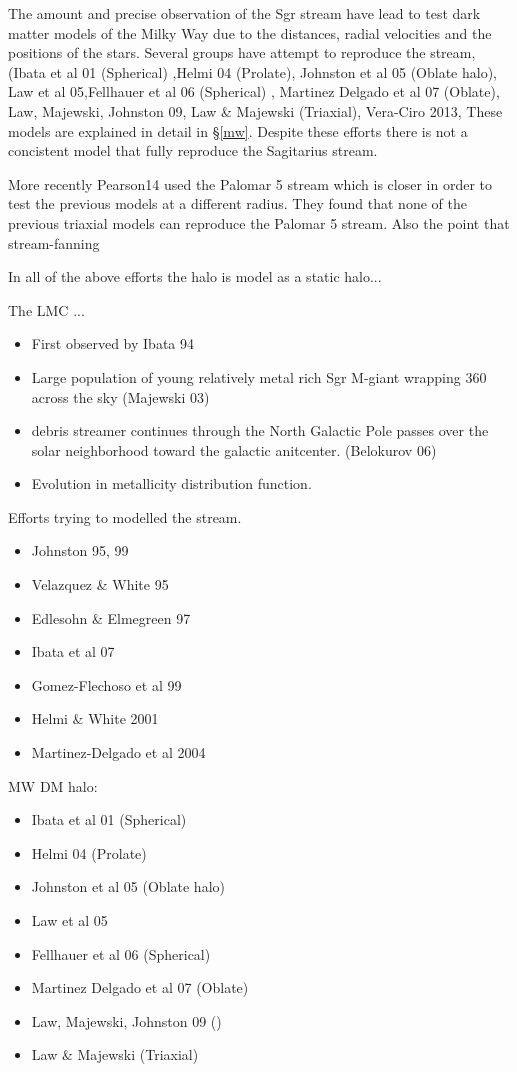 \documentclass[12pt]{article}
\begin{document}
The amount and precise observation of the Sgr stream have lead to test dark matter models of
the Milky Way due to the distances, radial velocities and the positions of
the stars. Several groups have attempt to reproduce the stream, (Ibata et al 01 (Spherical)
,Helmi 04 (Prolate), Johnston et al 05 (Oblate halo), Law et al 05,Fellhauer et al 06 (Spherical)
, Martinez Delgado et al 07 (Oblate), Law, Majewski, Johnston 09, Law \& Majewski (Triaxial),
Vera-Ciro 2013, These models are explained in detail in \S \ref{mw}. Despite these efforts
there is not a concistent model that fully reproduce the Sagitarius stream.

More recently Pearson14 used the Palomar 5 stream which is closer in order to test
the previous models at a different radius. They found that none of the previous
triaxial models can reproduce the Palomar 5 stream. Also the point that stream-fanning 

In all of the above efforts the halo is model as a static halo...


The LMC ...



\begin{itemize}
\item First observed by Ibata 94
\item Large population of young relatively metal rich Sgr M-giant wrapping 360
across the sky  (Majewski 03)
\item debris streamer continues through the North Galactic Pole passes over the 
solar neighborhood toward the galactic anitcenter. (Belokurov 06)
\item Evolution in metallicity distribution function.
\end{itemize}

Efforts trying to modelled the stream.

\begin{itemize}
\item Johnston 95, 99
\item Velazquez \& White 95
\item Edlesohn \& Elmegreen 97
\item Ibata et al 07
\item Gomez-Flechoso et al 99
\item Helmi \& White 2001
\item Martinez-Delgado et al 2004
\end{itemize}

MW DM halo:

\begin{itemize}
\item Ibata et al 01 (Spherical)
\item Helmi 04 (Prolate)
\item Johnston et al 05 (Oblate halo)
\item Law et al 05
\item Fellhauer et al 06 (Spherical)
\item Martinez Delgado et al 07 (Oblate)
\item Law, Majewski, Johnston 09 ()
\item Law \& Majewski (Triaxial)

\end{itemize}
\end{document}
